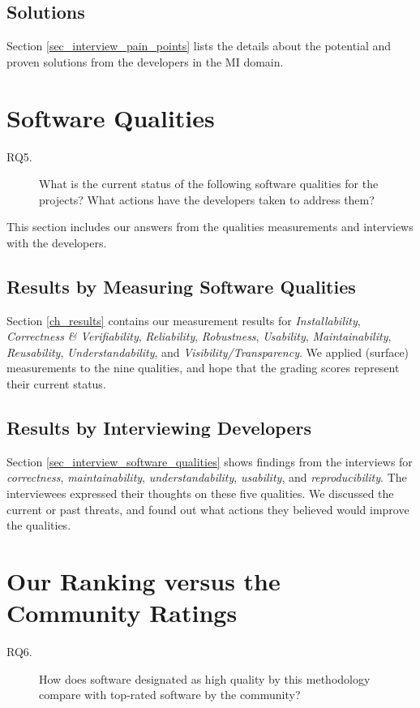 \subsection{Solutions}
Section \ref{sec_interview_pain_points} lists the details about the potential and proven solutions from the developers in the MI domain.

\section{Software Qualities}
\label{sec_rq_qualities}
\begin{description}\item[RQ5.] What is the current status of the following software qualities for the projects? What actions have the developers taken to address them?\end{description}

This section includes our answers from the qualities measurements and interviews with the developers.

\subsection{Results by Measuring Software Qualities}
Section \ref{ch_results} contains our measurement results for \textit{Installability}, \textit{Correctness \& Verifiability}, \textit{Reliability}, \textit{Robustness}, \textit{Usability}, \textit{Maintainability}, \textit{Reusability}, \textit{Understandability}, and \textit{Visibility/Transparency}. We applied (surface) measurements to the nine qualities, and hope that the grading scores represent their current status.

\subsection{Results by Interviewing Developers}
Section \ref{sec_interview_software_qualities} shows findings from the interviews for \textit{correctness}, \textit{maintainability}, \textit{understandability}, \textit{usability}, and \textit{reproducibility}. The interviewees expressed their thoughts on these five qualities. We discussed the current or past threats, and found out what actions they believed would improve the qualities.

\section{Our Ranking versus the Community Ratings}
\label{sec_rq_comparison}
\begin{description}
\item[RQ6.] How does software designated as high quality by this methodology compare with top-rated software by the community?
\end{description}

